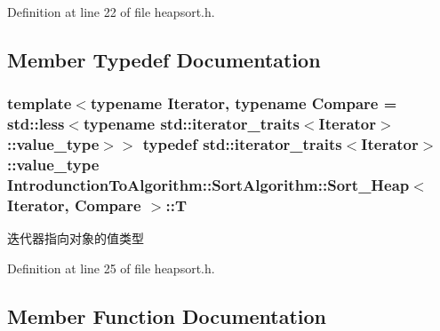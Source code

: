 Definition at line 22 of file heapsort.\+h.



\subsection{Member Typedef Documentation}
\hypertarget{class_introdunction_to_algorithm_1_1_sort_algorithm_1_1_sort___heap_a919579152d685b356d4776fc8d2eeb90}{}
\subsubsection[{T}]{\setlength{\rightskip}{0pt plus 5cm}template$<$typename Iterator, typename Compare = std\+::less$<$typename std\+::iterator\+\_\+traits$<$\+Iterator$>$\+::value\+\_\+type$>$$>$ typedef std\+::iterator\+\_\+traits$<$Iterator$>$\+::value\+\_\+type {\bf Introdunction\+To\+Algorithm\+::\+Sort\+Algorithm\+::\+Sort\+\_\+\+Heap}$<$ Iterator, Compare $>$\+::{\bf T}}\label{class_introdunction_to_algorithm_1_1_sort_algorithm_1_1_sort___heap_a919579152d685b356d4776fc8d2eeb90}
迭代器指向对象的值类型 

Definition at line 25 of file heapsort.\+h.



\subsection{Member Function Documentation}
\hypertarget{class_introdunction_to_algorithm_1_1_sort_algorithm_1_1_sort___heap_a12f57e7bb47939f0f4f0994ee81d4b9e}{}
